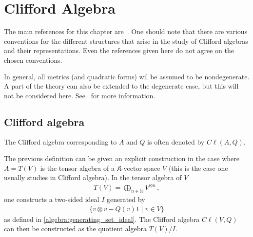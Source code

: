 \chapter{Clifford Algebra}\label{chapter:clifford}

    The main references for this chapter are~\citet{gallier_clifford_2008,choquet-bruhat_analysis_1991,choquet-bruhat_analysis_2000}. One should note that there are various conventions for the different structures that arise in the study of Clifford algebras and their representations. Even the references given here do not agree on the chosen conventions.

    In general, all metrics (and quadratic forms) wil be assumed to be nondegenerate. A part of the theory can also be extended to the degenerate case, but this will not be considered here. See~\citet{gallier_clifford_2008} for more information.

    \minitoc

\section{Clifford algebra}

    \begin{notation}
        The Clifford algebra corresponding to $A$ and $Q$ is often denoted by $C\ell(A,Q)$.
    \end{notation}

    \begin{construct}
        The previous definition can be given an explicit construction in the case where $A=T(V)$ is the tensor algebra of a $\mathfrak{K}$-vector space $V$ (this is the case one usually studies in Clifford algebra). In the tensor algebra of $V$
        \begin{gather}
            T(V) = \bigoplus_{n\in\mathbb{N}}V^{\otimes n}\,,
        \end{gather}
        one constructs a two-sided ideal $I$ generated by
        \begin{gather}
            \{v\otimes v - Q(v)1\mid v\in V\}
        \end{gather}
        as defined in \cref{algebra:generating_set_ideal}. The Clifford algebra $C\ell(V,Q)$ can then be constructed as the quotient algebra $T(V)/I$.
    \end{construct}

